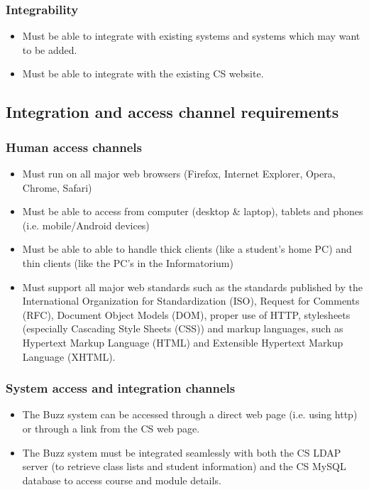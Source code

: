 \documentclass[12pt, oneside]{article}
\begin{document}
		\subsubsection{Integrability}
				\begin{itemize}
					\item Must be able to integrate with existing systems and systems which may want to be added.
					\item Must be able to integrate with the existing CS website.
				\end{itemize}
				
	\subsection{Integration and access channel requirements}
				\subsubsection{Human access channels}
				\begin{itemize}
					\item Must run on all major web browsers (Firefox, Internet Explorer, Opera, Chrome, Safari)
					\item Must be able to access from computer (desktop \& laptop), tablets and phones (i.e. mobile/Android devices)
					\item Must be able to able to handle thick clients (like a student's home PC) and thin clients (like the PC's in the Informatorium)
					\item Must support all major web standards such as the standards published by the International Organization for Standardization (ISO), Request for Comments (RFC), Document Object Models (DOM), proper use of HTTP, stylesheets (especially Cascading Style Sheets (CSS)) and markup languages, such as Hypertext Markup Language (HTML) and Extensible Hypertext Markup Language (XHTML).
				\end{itemize}
				\subsubsection{System access and integration channels}
				\begin{itemize}
					\item The Buzz system can be accessed through a direct web page (i.e. using http) or through a link from the CS web page.
					\item The Buzz system must be integrated seamlessly with both the CS LDAP server (to retrieve class lists and student information) and the CS MySQL database to access course and module details.
				\end{itemize}
\end{document}
